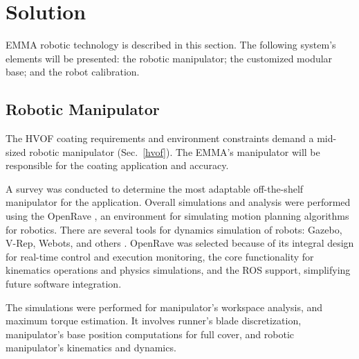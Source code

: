 \section{Solution}\label{solution}


EMMA robotic technology is described in this section. The following system's
elements will be presented: the robotic manipulator; the customized modular
base; and the robot calibration. 

\subsection{Robotic Manipulator}\label{manipulator}
The HVOF coating requirements and environment constraints demand a mid-sized
robotic manipulator (Sec.~\ref{hvof}). The EMMA's manipulator will be responsible
for the coating application and accuracy.

A survey was conducted to determine the most adaptable off-the-shelf manipulator
for the application. Overall simu\-lations and analysis were
performed using the OpenRave \cite{diankov2008openrave}, an environment for
simulating motion planning algorithms for robotics. There are several tools for
dynamics simulation of robots: Gazebo, V-Rep, Webots, and others%
. OpenRave was selected because of its integral design for real-time control
and execution monitoring, the core functionality for kinematics operations and
physics simulations, and the ROS support, simplifying future software
integration.

The simulations were performed for manipulator's workspace analysis, and maximum
torque estimation. It involves runner's blade discretization, manipulator's base
position computations for full cover, and robotic manipulator's kinematics and dynamics. 

